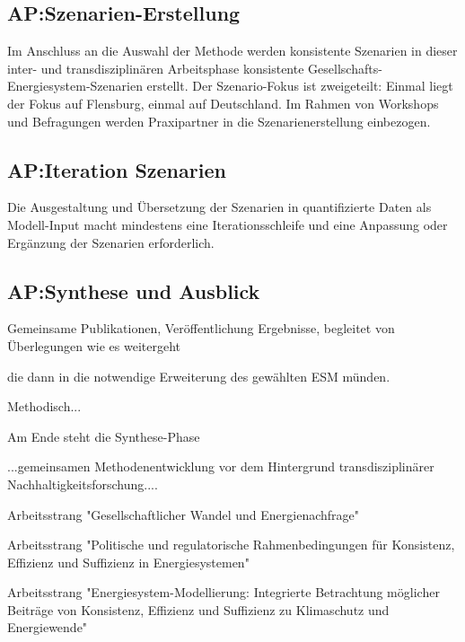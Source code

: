 \documentclass[a4paper,11pt,twoside]{scrartcl}
\begin{document}
\subsection*{AP:Szenarien-Erstellung}
Im Anschluss an die Auswahl der Methode werden konsistente Szenarien in dieser inter- und transdisziplinären Arbeitsphase konsistente Gesellschafts-Energiesystem-Szenarien erstellt. Der Szenario-Fokus ist zweigeteilt: Einmal liegt der Fokus auf Flensburg, einmal auf Deutschland. Im Rahmen von Workshops und Befragungen werden Praxipartner in die Szenarienerstellung einbezogen. 

\subsection*{AP:Iteration Szenarien}
Die Ausgestaltung und Übersetzung der Szenarien in quantifizierte Daten als Modell-Input macht mindestens eine Iterationsschleife und eine Anpassung oder Ergänzung der Szenarien erforderlich.

\subsection*{AP:Synthese und Ausblick}
Gemeinsame Publikationen, Veröffentlichung Ergebnisse, begleitet von Überlegungen wie es weitergeht


die dann in die notwendige Erweiterung des gewählten ESM münden.



Methodisch...

Am Ende steht die Synthese-Phase

...gemeinsamen Methodenentwicklung vor dem Hintergrund transdisziplinärer Nachhaltigkeitsforschung....

Arbeitsstrang "Gesellschaftlicher Wandel und Energienachfrage"

Arbeitsstrang "Politische und regulatorische Rahmenbedingungen für Konsistenz, Effizienz und Suffizienz in Energiesystemen"

Arbeitsstrang "Energiesystem-Modellierung: Integrierte Betrachtung möglicher Beiträge von Konsistenz, Effizienz und Suffizienz zu Klimaschutz und Energiewende"
\end{document}
